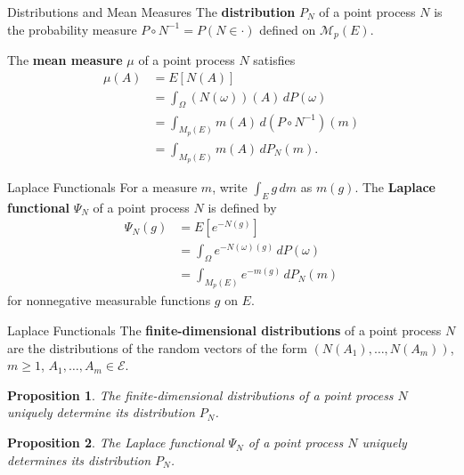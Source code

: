 \documentclass{beamer}
\newtheorem{proposition}{Proposition}
\begin{document}
\begin{frame}{Distributions and Mean Measures}
    The \textbf{distribution} $P_N$ of a point process $N$ is the probability measure $P \circ N^{-1} = P(N \in \cdot)$ defined on $\mathcal{M}_p(E)$.

    \smallskip

    The \textbf{mean measure} $\mu$ of a point process $N$ satisfies
    \begin{align*}
        \mu(A) &= E[N(A)] \\
        &= \int_{\Omega} (N(\omega))(A)\,dP(\omega) \\
        &= \int_{M_p(E)} m(A)\,d(P \circ N^{-1})(m) \\
        &= \int_{M_p(E)} m(A)\,dP_N(m).
    \end{align*}
\end{frame}

\begin{frame}{Laplace Functionals}
    For a measure $m$, write $\int_E g\,dm$ as $m(g)$. The \textbf{Laplace functional} $\Psi_N$ of a point process $N$ is defined by
    \begin{align*}
        \Psi_N(g) &= E[e^{-N(g)}] \\
        &= \int_{\Omega} e^{-N(\omega)(g)}\,dP(\omega) \\
        &= \int_{M_p(E)} e^{-m(g)}\,dP_N(m)
    \end{align*}
    for nonnegative measurable functions $g$ on $E$.
\end{frame}

\begin{frame}{Laplace Functionals}
    The \textbf{finite-dimensional distributions} of a point process $N$ are the distributions of the random vectors of the form $(N(A_1), \ldots, N(A_m))$, $m \ge 1$, $A_1, \ldots, A_m \in \mathcal{E}$.
    \begin{proposition}
        The finite-dimensional distributions of a point process $N$ uniquely determine its distribution $P_N$.
    \end{proposition}
    \begin{proposition}
        The Laplace functional $\Psi_N$ of a point process $N$ uniquely determines its distribution $P_N$.
    \end{proposition}
\end{frame}
\end{document}
